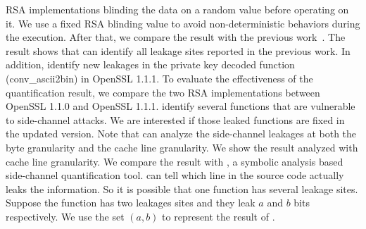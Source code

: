 RSA implementations blinding the data on a random value before operating on it. We use a fixed RSA blinding value to avoid non-deterministic behaviors during the execution. After that, we compare the result with the previous work~\cite{bao2021abacus,203878}. The result shows that \ctool{} can identify all leakage sites reported in the previous work. In addition, \ctool{} identify new leakages in the private key decoded function (\textsf{conv\_ascii2bin}) in OpenSSL 1.1.1.  To evaluate the effectiveness of the quantification result, we compare the two RSA implementations between OpenSSL 1.1.0 and OpenSSL 1.1.1.  \ctool{} identify several functions that are vulnerable to side-channel attacks. We are interested if those leaked functions are fixed in the updated version.
Note that \ctool{} can analyze the side-channel leakages at both the byte granularity and the cache line granularity. We show the result analyzed with cache line granularity. We compare the result with \tool{}, a symbolic analysis based side-channel quantification tool. \tool{} can tell which line in the source code actually leaks the information. So it is possible that one function has several leakage sites. Suppose the function has two leakages sites and they leak $a$ and $b$ bits respectively. We use the set $(a, b)$ to represent the result of \tool{}.

